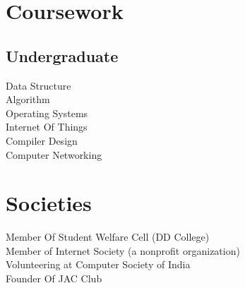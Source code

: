 \documentclass[]{deedy-resume-reversed}
\begin{document}
\begin{minipage}[t]{0.33\textwidth}


\section{Coursework}


\subsection{Undergraduate}
Data Structure \\
Algorithm \\
Operating Systems  \\
Internet Of Things\\
Compiler Design\\
Computer Networking \\
\sectionsep




\section{Societies}
 \textbullet{} Member Of Student Welfare Cell (DD College)\\
 \textbullet{} Member of Internet Society (a nonprofit organization)\\
 \textbullet{}Volunteering at Computer  Society of India\\
 \textbullet{}Founder Of JAC Club\\
\sectionsep


\end{minipage}
\end{document}
